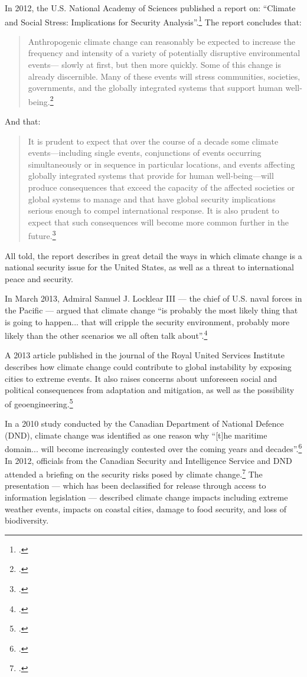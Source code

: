In 2012, the U.S. National Academy of Sciences published a report on: ``Climate and Social Stress: Implications for Security Analysis''.\footcite[][]{SocialStress}
The report concludes that:
\begin{quote}
Anthropogenic climate change can reasonably be expected to increase the frequency and intensity of a variety of potentially disruptive environmental events— slowly at first, but then more quickly. Some of this change is already discernible. Many of these events will stress communities, societies, governments, and the globally integrated systems that support human well-being.\footcite[][p. S-2]{SocialStress}
\end{quote}
And that:
\begin{quote}
It is prudent to expect that over the course of a decade some climate events—including single events, conjunctions of events occurring simultaneously or in sequence in particular locations, and events affecting globally integrated systems that provide for human well-being—will produce consequences that exceed the capacity of the affected societies or global systems to manage and that have global security implications serious enough to compel international response. It is also prudent to expect that such consequences will become more common further in the future.\footcite[][p. S-4]{SocialStress}
\end{quote}
All told, the report describes in great detail the ways in which climate change is a national security issue for the United States, as well as a threat to international peace and security.


In March 2013, Admiral Samuel J. Locklear III --- the chief of U.S. naval forces in the Pacific --- argued that climate change ``is probably the most likely thing that is going to happen... that will cripple the security environment, probably more likely than the other scenarios we all often talk about''.\footcite[][]{PacificChiefWorry}



A 2013 article published in the journal of the Royal United Services Institute describes how climate change could contribute to global instability by exposing cities to extreme events.
It also raises concerns about unforeseen social and political consequences from adaptation and mitigation, as well as the possibility of geoengineering.\footcite[][]{DalbyCCSecurity}



In a 2010 study conducted by the Canadian Department of National Defence (DND), climate change was identified as one reason why ``[t]he maritime domain... will become increasingly contested over the coming years and decades''.\footcite[][p. 25]{SinkingFeeling}
In 2012, officials from the Canadian Security and Intelligence Service and DND attended a briefing on the security risks posed by climate change.\footcite[][]{CCSecurityBriefing}
The presentation --- which has been declassified for release through access to information legislation --- described climate change impacts including extreme weather events, impacts on coastal cities, damage to food security, and loss of biodiversity.



